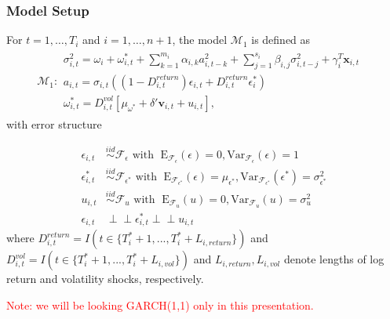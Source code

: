 \documentclass[9pt]{beamer}
\newcommand{\x}{\textbf{x}}
\newcommand{\simiid}{\stackrel{iid}{\sim}} %
\newcommand{\indep}{\perp \!\!\! \perp } %
\def\mrm#1{\mathrm{#1}} %
\def\mc#1{\mathcal{#1}} %
\def\E{\mathbb{E}} %
\def\mc#1{\mathcal{#1}}
\theoremstyle{definition}
\begin{document}
\begin{frame}
\frametitle{Model Setup}

\fontsize{6}{7.2}

For $t= 1, \ldots, T_i$ and $i = 1, \ldots, n+1$, the model $\mc{M}_1$ is defined as 
\begin{align*}
  \mc{M}_1 \colon \begin{array}{l}
     \sigma^{2}_{i,t} = \omega_{i} + \omega^{*}_{i,t} + \sum^{m_{i}}_{k=1}\alpha_{i,k}a^{2}_{i,t-k} + \sum_{j=1}^{s_{i}}\beta_{i,j}\sigma_{i,t-j}^{2} + \gamma_{i}^{T} \x_{i,t} \text{ }\\[.2cm]
     a_{i,t} = \sigma_{i,t}((1-D^{return}_{i,t})\epsilon_{i,t} + D^{return}_{i,t}\epsilon^{*}_{i})\\[.2cm]
    \omega_{i,t}^{*} = D^{vol}_{i,t}[\mu_{\omega^{*}}+\delta'\textbf{v}_{i, t}+ u_{i,t}],
  \end{array}
  \end{align*}\label{model_1}
with error structure

  \begin{align*}
    \epsilon_{i,t} &\simiid \mc{F}_{\epsilon} \text{ with }  \; \mrm{E}_{\mc{F}_{\epsilon}}(\epsilon) = 0, \mrm{Var}_{\mc{F}_{\epsilon}}(\epsilon)  = 1  \\
    \epsilon^{*}_{i,t} &\simiid \mc{F}_{\epsilon^{*}} \text{ with }  \; \mrm{E}_{\mc{F}_{\epsilon^{*}}}(\epsilon) = \mu_{\epsilon^{*}}, \mrm{Var}_{\mc{F}_{\epsilon^{*}}}(\epsilon^{*})  = \sigma^2_{\epsilon^{*}}  \\
    u_{i,t} & \simiid  \mc{F}_{u} \text{ with }  \; \mrm{E}_{\mc{F}_{u}}(u) = 0, \mrm{Var}_{\mc{F}_{u}}(u) = \sigma^2_{u}\\
    \epsilon_{i,t} & \indep  \epsilon^{*}_{i,t}  \indep u_{i,t}
    \end{align*}
where $D^{return}_{i,t} = I(t \in \{T_i^* + 1,...,T_i^* + L_{i, return}\})$ and $D^{vol}_{i,t} = I(t \in \{T_i^* + 1,...,T_i^* + L_{i, vol}\})$ and $L_{i,return},L_{i,vol}$ denote lengths of log return and volatility shocks, respectively.  

\bigbreak

\textcolor{red}{Note: we will be looking GARCH(1,1) only in this presentation.}
\end{frame}


\end{document}
